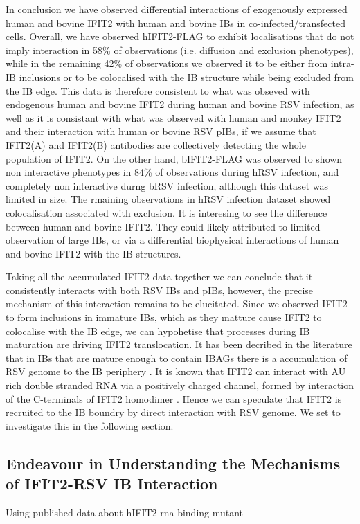 In conclusion we have observed differential interactions of exogenously expressed human and bovine IFIT2 with human and bovine IBs in co-infected/transfected cells. Overall, we have observed hIFIT2-FLAG to exhibit localisations that do not imply interaction in 58\% of observations (i.e. diffusion and exclusion phenotypes), while in the remaining 42\% of observations we observed it to be either from intra-IB inclusions or to be colocalised with the IB structure while being excluded from the IB edge. This data is therefore consistent to what was obseved with endogenous human and bovine IFIT2 during human and bovine RSV infection, as well as it is consistant with what was observed with human and monkey IFIT2 and their interaction with human or bovine RSV pIBs, if we assume that IFIT2(A) and IFIT2(B) antibodies are collectively detecting the whole population of IFIT2. On the other hand, bIFIT2-FLAG was observed to shown non interactive phenotypes in 84\% of observations during hRSV infection, and completely non interactive durng bRSV infection, although this dataset was limited in size. The rmaining observations in hRSV infection dataset showed colocalisation associated with exclusion. It is interesing to see the difference between human and bovine IFIT2. They could likely attributed to limited observation of large IBs, or via a differential biophysical interactions of human and bovine IFIT2 with the IB structures.

Taking all the accumulated IFIT2 data together we can conclude that it consistently interacts with both RSV IBs and pIBs, however, the precise mechanism of this interaction remains to be elucitated. Since we observed IFIT2 to form inclusions in immature IBs, which as they matture cause IFIT2 to colocalise with the IB edge, we can hypohetise that processes during IB maturation are driving IFIT2 translocation. It has been decribed in the literature that in IBs that are mature enough to contain IBAGs there is a accumulation of RSV genome to the IB periphery \cite{Rincheval2017FunctionalVirus}. It is known that IFIT2 can interact with AU rich double stranded RNA via a positively charged channel, formed by interaction of the C-terminals of IFIT2 homodimer \cite{Yang2012CrystalMechanisms, Vladimer2014IFITs:Proteins}. Hence we can speculate that IFIT2 is recruited to the IB boundry by direct interaction with RSV genome. We set to investigate this in the following section.

\subsection{Endeavour in Understanding the Mechanisms of IFIT2-RSV IB Interaction} \label{subsec:Endeavour in Understanding the Mechanisms of IFIT2-RSV IB Interaction}
Using published data about hIFIT2 rna-binding mutant

